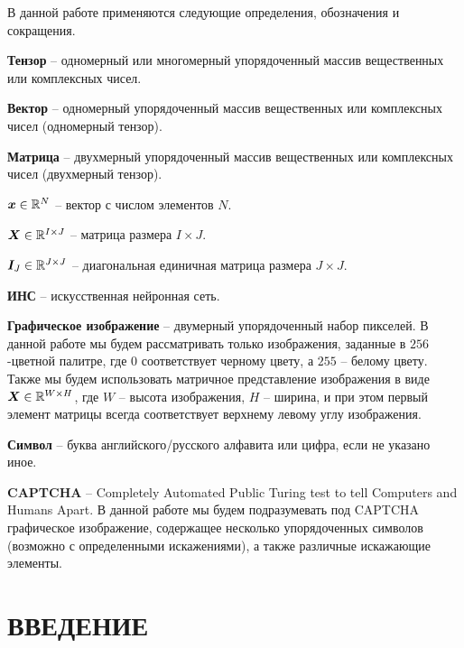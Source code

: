 \documentclass[a4paper,12pt,russian]{article} %
\begin{document}
В данной работе применяются следующие определения, обозначения и сокращения.

\newcommand\MCabbr[2]{\begin{flushleft}\textbf{#1} – #2.\\\end{flushleft}}

\MCabbr{Тензор}{одномерный или многомерный упорядоченный массив вещественных или комплексных чисел}
\MCabbr{Вектор}{одномерный упорядоченный массив вещественных или комплексных чисел (одномерный тензор)}
\MCabbr{Матрица}{двухмерный упорядоченный массив вещественных или комплексных чисел (двухмерный тензор)}
\MCabbr{$\bm{x} \in \mathbb{R}^{N}$}{вектор с числом элементов $N$}
\MCabbr{$\bm{X} \in \mathbb{R}^{I \times J}$}{матрица размера $I \times J$}
\MCabbr{$\bm{I}_{J} \in \mathbb{R}^{J \times J}$}{диагональная единичная матрица размера $J \times J$}
\MCabbr{ИНС}{искусственная нейронная сеть}
\MCabbr{Графическое изображение}{двумерный упорядоченный набор пикселей. В данной работе мы будем рассматривать только изображения, заданные в $256$-цветной палитре, где $0$ соответствует черному цвету, а $255$ -- белому цвету. Также мы будем использовать матричное представление изображения в виде $\bm{X} \in \mathbb{R}^{W \times H}$, где $W$ -- высота изображения, $H$ -- ширина, и при этом первый элемент матрицы всегда соответствует верхнему левому углу изображения}
\MCabbr{Символ}{буква английского/русского алфавита или цифра, если не указано иное}
\MCabbr{CAPTCHA}{Completely Automated Public Turing test to tell Computers and Humans Apart. В данной работе мы будем подразумевать под CAPTCHA графическое изображение, содержащее несколько упорядоченных символов (возможно с определенными искажениями), а также различные искажающие элементы}

\newpage
\section*{ВВЕДЕНИЕ}
\end{document}
